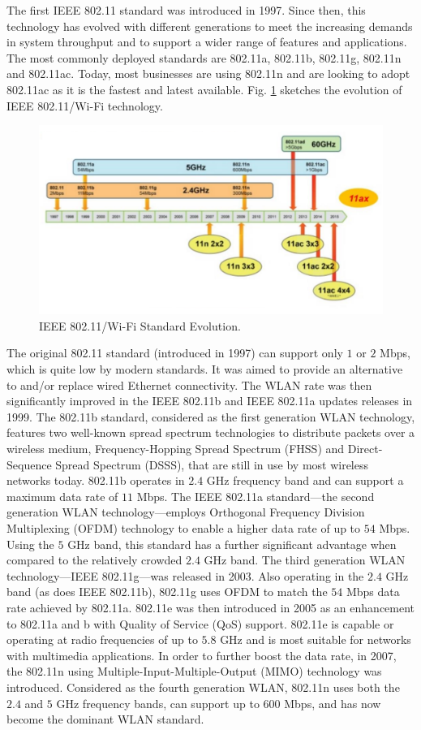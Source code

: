 The first IEEE 802.11 standard was introduced in 1997. Since then, this technology has evolved with different generations to meet the increasing demands in system throughput and to support a wider range of features and applications. The most commonly deployed standards are 802.11a, 802.11b, 802.11g, 802.11n and 802.11ac. Today, most businesses are using 802.11n and are looking to adopt 802.11ac as it is the fastest and latest available. Fig. \ref{figs:Wi-Fi-evolution} sketches the evolution of IEEE 802.11/\mbox{Wi-Fi} technology.
\begin{figure}[!ht]
	\centering
	\includegraphics[width=1.0\columnwidth]{figs/Wi-Fi-evolution.pdf}
	\caption{IEEE 802.11/\mbox{Wi-Fi} Standard Evolution.}
	\label{figs:Wi-Fi-evolution}
\end{figure}
The original 802.11 standard (introduced in 1997) can support only $1$ or $2$ Mbps, which is quite low by modern standards. It was aimed to provide an alternative to and/or replace wired Ethernet connectivity. The WLAN rate was then significantly improved in the IEEE 802.11b and IEEE 802.11a updates releases in 1999. The 802.11b standard, considered as the first generation WLAN technology, features two well-known spread spectrum technologies to distribute packets over a wireless medium, Frequency-Hopping Spread Spectrum (FHSS) and Direct-Sequence Spread Spectrum (DSSS), that are still in use by most wireless networks today. 802.11b operates in $2.4$ GHz frequency band and can support a maximum data rate of $11$ Mbps. The IEEE 802.11a standard---the second generation WLAN technology---employs Orthogonal Frequency Division Multiplexing (OFDM) technology to enable a higher data rate of up to $54$ Mbps. Using the $5$ GHz band, this standard has a further significant advantage when compared to the relatively crowded $2.4$ GHz band. The third generation WLAN technology---IEEE 802.11g---was released in 2003. Also operating in the $2.4$ GHz band (as does IEEE 802.11b),  802.11g uses OFDM to match the $54$ Mbps data rate achieved by 802.11a. 802.11e was then introduced in 2005 as an enhancement to 802.11a and b with Quality of Service (QoS) support. 802.11e is capable or operating at radio frequencies of up to $5.8$ GHz and is most suitable for networks with multimedia applications. In order to further boost the data rate, in 2007, the 802.11n using Multiple-Input-Multiple-Output (MIMO) technology was introduced. Considered as the fourth generation WLAN, 802.11n uses both the $2.4$ and $5$ GHz frequency bands, can support up to $600$ Mbps, and has now become the dominant WLAN standard.

